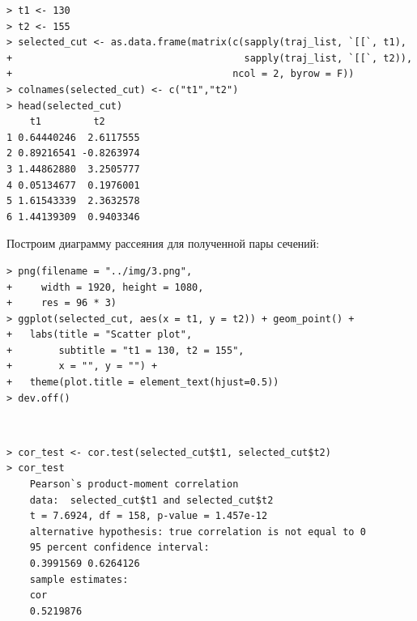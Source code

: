 \documentclass[14pt,a4paper]{scrartcl}
\begin{document}
\begin{verbatim}
> t1 <- 130
> t2 <- 155
> selected_cut <- as.data.frame(matrix(c(sapply(traj_list, `[[`, t1),
+                                        sapply(traj_list, `[[`, t2)),
+                                      ncol = 2, byrow = F))
> colnames(selected_cut) <- c("t1","t2")
> head(selected_cut)
	t1         t2
1 0.64440246  2.6117555
2 0.89216541 -0.8263974
3 1.44862880  3.2505777
4 0.05134677  0.1976001
5 1.61543339  2.3632578
6 1.44139309  0.9403346
\end{verbatim}

Построим диаграмму рассеяния для полученной пары сечений:

\begin{verbatim}
> png(filename = "../img/3.png",
+     width = 1920, height = 1080,
+     res = 96 * 3)
> ggplot(selected_cut, aes(x = t1, y = t2)) + geom_point() +
+   labs(title = "Scatter plot",
+        subtitle = "t1 = 130, t2 = 155",
+        x = "", y = "") + 
+   theme(plot.title = element_text(hjust=0.5))
> dev.off()
\end{verbatim}

\begin{figure}[H]
	\begin{minipage}[h]{1\linewidth}
		  \\
	\end{minipage}
\end{figure}


\begin{verbatim}
> cor_test <- cor.test(selected_cut$t1, selected_cut$t2)
> cor_test
	Pearson`s product-moment correlation
	data:  selected_cut$t1 and selected_cut$t2
	t = 7.6924, df = 158, p-value = 1.457e-12
	alternative hypothesis: true correlation is not equal to 0
	95 percent confidence interval:
	0.3991569 0.6264126
	sample estimates:
	cor 
	0.5219876 
\end{verbatim}
\end{document}
